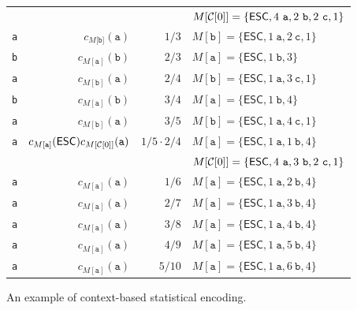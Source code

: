 \begin{figure}
\begin{center}
\begin{tabular}{crrl}
    ~       & & & $M[{\cal C}[0]]=\{\mathsf{ESC},4~\mathtt{a},2~\mathtt{b},2~\mathtt{c},1\}$\\ 
    {\tt a} & $c_{M[\mathtt{b]}}(\mathtt a)$ & $1/3$ & $M[\mathtt{b}]=\{\mathsf{ESC},1~\mathtt{a},2~\mathtt{c},1\}$\\
    {\tt b} & $c_{M[\mathtt{a}]}(\mathtt b)$ & $2/3$ & $M[\mathtt{a}]=\{\mathsf{ESC},1~\mathtt{b},3\}$\\
    {\tt a} & $c_{M[\mathtt{b}]}(\mathtt a)$ & $2/4$ & $M[\mathtt{b}]=\{\mathsf{ESC},1~\mathtt{a},3~\mathtt{c},1\}$\\
    {\tt b} & $c_{M[\mathtt{a}]}(\mathtt b)$ & $3/4$ & $M[\mathtt{a}]=\{\mathsf{ESC},1~\mathtt{b},4\}$\\
    {\tt a} & $c_{M[\mathtt{b}]}(\mathtt a)$ & $3/5$ & $M[\mathtt{b}]=\{\mathsf{ESC},1~\mathtt{a},4~\mathtt{c},1\}$\\
    {\tt a} & $c_{M[\mathtt{a}]}(\mathsf{ESC})c_{M[{\cal C}[0]]}(\mathtt a)$ & $1/5\cdot 2/4$ & $M[\mathtt{a}]=\{\mathsf{ESC},1~\mathtt{a},1~\mathtt{b},4\}$\\
    ~       & & & $M[{\cal C}[0]]=\{\mathsf{ESC},4~\mathtt{a},3~\mathtt{b},2~\mathtt{c},1\}$\\
    {\tt a} & $c_{M[\mathtt{a}]}(\mathtt a)$ & $1/6$ & $M[\mathtt{a}]=\{\mathsf{ESC},1~\mathtt{a},2~\mathtt{b},4\}$\\
    {\tt a} & $c_{M[\mathtt{a}]}(\mathtt a)$ & $2/7$ & $M[\mathtt{a}]=\{\mathsf{ESC},1~\mathtt{a},3~\mathtt{b},4\}$\\
    {\tt a} & $c_{M[\mathtt{a}]}(\mathtt a)$ & $3/8$ & $M[\mathtt{a}]=\{\mathsf{ESC},1~\mathtt{a},4~\mathtt{b},4\}$\\
    {\tt a} & $c_{M[\mathtt{a}]}(\mathtt a)$ & $4/9$ & $M[\mathtt{a}]=\{\mathsf{ESC},1~\mathtt{a},5~\mathtt{b},4\}$\\
    {\tt a} & $c_{M[\mathtt{a}]}(\mathtt a)$ & $5/10$ & $M[\mathtt{a}]=\{\mathsf{ESC},1~\mathtt{a},6~\mathtt{b},4\}$
  \end{tabular}
\end{center}
\caption{An example of context-based statistical
  encoding.\label{fig:PPM}}
\end{figure}

